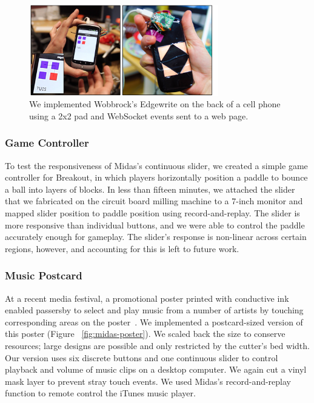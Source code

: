 \begin{figure}[t]
\centering
\includegraphics[width=3.25in]{figures/midas/edgewrite.jpg}
\caption{We implemented Wobbrock's Edgewrite on the back of a cell phone using a 2x2 pad and WebSocket events sent to a web page.} 
\label{fig:midas-edgewrite}
\end{figure}

        \subsubsection{Game Controller}
To test the responsiveness of Midas's continuous slider, we created a simple game controller for Breakout, in which players horizontally position a paddle to bounce a ball into layers of blocks. In less than fifteen minutes, we attached the slider that we fabricated on the circuit board milling machine to a 7-inch monitor and mapped slider position to paddle position using record-and-replay.
The slider is more responsive than individual buttons, and we were able to control the paddle accurately enough for gameplay.  The slider's response is non-linear across certain regions, however, and accounting for this is left to future work.

        \subsubsection{Music Postcard}
At a recent media festival, a promotional poster printed with conductive ink enabled passersby to select and play music from a number of artists by touching corresponding areas on the poster~\cite{paperposter}. We implemented a postcard-sized version of this poster (Figure ~\ref{fig:midas-poster}).  We scaled back the size to conserve resources; large designs are possible and only restricted by the cutter's bed width. Our version uses six discrete buttons and one continuous slider to control playback and volume of music clips on a desktop computer. We again cut a vinyl mask layer to prevent stray touch events. We used Midas's record-and-replay function to remote control the iTunes music player.


